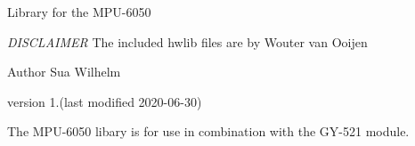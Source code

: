 Library for the M\+P\+U-\/6050

{\itshape D\+I\+S\+C\+L\+A\+I\+M\+ER} The included hwlib files are by Wouter van Ooijen

Author Sua Wilhelm

version 1.(last modified 2020-\/06-\/30)

The M\+P\+U-\/6050 libary is for use in combination with the G\+Y-\/521 module. ~\newline
 